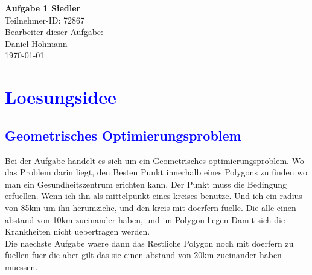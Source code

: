 \documentclass{article}
\begin{document}
\thispagestyle{empty}
\begin{center}
\Huge{\textbf{Aufgabe 1 Siedler}}
\\
\LARGE{Teilnehmer-ID: 72867}
\\
\LARGE{Bearbeiter dieser Aufgabe: \\ Daniel Hohmann}
\\
\LARGE{\today}
\end{center}
\newpage
\setcounter{page}{1}
\tableofcontents
\newpage
\section{\textcolor{blue}{Loesungsidee}}
\subsection{\textcolor{blue}{Geometrisches Optimierungsproblem}}
Bei der Aufgabe handelt es sich um ein Geometrisches optimierungsproblem. Wo das Problem darin liegt, den Besten Punkt innerhalb eines Polygons zu finden wo man ein Gesundheitszentrum erichten kann. Der Punkt muss die Bedingung erfuellen. Wenn ich ihn als mittelpunkt eines kreises benutze. Und ich ein radius von 85km um ihn herumziehe, und den kreis mit doerfern fuelle. Die alle einen abstand von 10km zueinander haben, und im Polygon liegen Damit sich die Krankheiten nicht uebertragen werden.
\\
Die naechste Aufgabe waere dann das Restliche Polygon noch mit doerfern zu fuellen fuer die aber gilt das sie einen abstand von 20km zueinander haben muessen.
\end{document}
